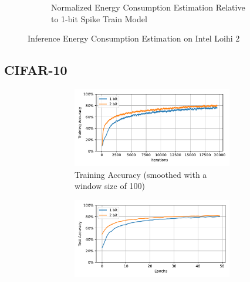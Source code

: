 \begin{figure}[H]
\begin{subfigure}[H]{0.495\textwidth}
                \caption{Normalized Energy Consumption Estimation Relative to 1-bit Spike Train Model}
            \end{subfigure}
            \caption{Inference Energy Consumption Estimation on Intel Loihi 2}
        \end{figure}

    \subsection{CIFAR-10}
    \label{appendix:energy_tradeoff_cifar10}

        \begin{figure}[H]
            \centering
            \begin{subfigure}[H]{\textwidth}
                \centering
                \begin{subfigure}[H]{\textwidth}
                    \includegraphics[width=\textwidth]{../timesteps/CIFAR10/plots/cifar10_train_acc.pdf}
                    \caption{Training Accuracy (smoothed with a window size of 100)}
                \end{subfigure}
                \hfill
                \begin{subfigure}[H]{\textwidth}
                    \includegraphics[width=\textwidth]{../timesteps/CIFAR10/plots/cifar10_test_acc.pdf}

\end{subfigure}
\end{subfigure}
\end{figure}

